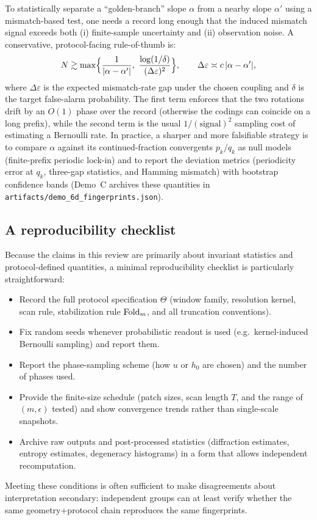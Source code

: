 \begin{remark}
To statistically separate a ``golden-branch'' slope $\alpha$ from a nearby slope $\alpha'$ using a mismatch-based test, one needs a record long enough that the induced mismatch signal exceeds both (i) finite-sample uncertainty and (ii) observation noise.
A conservative, protocol-facing rule-of-thumb is:
\[
N \gtrsim \max\Bigl\{\frac{1}{|\alpha-\alpha'|},\ \frac{\log(1/\delta)}{(\Delta\varepsilon)^2}\Bigr\},
\qquad \Delta\varepsilon\asymp c\,|\alpha-\alpha'|,
\]
where $\Delta\varepsilon$ is the expected mismatch-rate gap under the chosen coupling and $\delta$ is the target false-alarm probability. The first term enforces that the two rotations drift by an $O(1)$ phase over the record (otherwise the codings can coincide on a long prefix), while the second term is the usual $1/(\text{signal})^2$ sampling cost of estimating a Bernoulli rate.
In practice, a sharper and more falsifiable strategy is to compare $\alpha$ against its continued-fraction convergents $p_k/q_k$ as null models (finite-prefix periodic lock-in) and to report the deviation metrics (periodicity error at $q_k$, three-gap statistics, and Hamming mismatch) with bootstrap confidence bands (Demo~C archives these quantities in \texttt{artifacts/demo\_6d\_fingerprints.json}).
\end{remark}

\subsection{A reproducibility checklist}\label{sec:falsifiability:repro}

Because the claims in this review are primarily about invariant statistics and protocol-defined quantities, a minimal reproducibility checklist is particularly straightforward:
\begin{itemize}[leftmargin=*,itemsep=2pt]
  \item Record the full protocol specification $\Theta$ (window family, resolution kernel, scan rule, stabilization rule $\mathrm{Fold}_m$, and all truncation conventions).
  \item Fix random seeds whenever probabilistic readout is used (e.g.\ kernel-induced Bernoulli sampling) and report them.
  \item Report the phase-sampling scheme (how $u$ or $h_0$ are chosen) and the number of phases used.
  \item Provide the finite-size schedule (patch sizes, scan length $T$, and the range of $(m,\epsilon)$ tested) and show convergence trends rather than single-scale snapshots.
  \item Archive raw outputs and post-processed statistics (diffraction estimates, entropy estimates, degeneracy histograms) in a form that allows independent recomputation.
\end{itemize}
Meeting these conditions is often sufficient to make disagreements about interpretation secondary: independent groups can at least verify whether the same geometry+protocol chain reproduces the same fingerprints.

